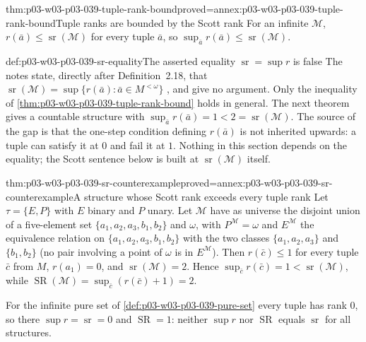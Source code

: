 \begin{hblemma}{thm:p03-w03-p03-039-tuple-rank-bound}{proved=annex:p03-w03-p03-039-tuple-rank-bound}{Tuple ranks are bounded by the Scott rank}
For an infinite \(\mathcal M\), \(r(\bar a)\le\operatorname{sr}(\mathcal M)\)
for every tuple \(\bar a\), so
\(\sup_{\bar a}r(\bar a)\le\operatorname{sr}(\mathcal M)\).
\end{hblemma}

\begin{hbwarning}{def:p03-w03-p03-039-sr-equality}{The asserted equality \(\operatorname{sr}=\sup r\) is false}
The notes state, directly after Definition~2.18, that
\(\operatorname{sr}(\mathcal M)=\sup\{r(\bar a):\bar a\in M^{<\omega}\}\)
\cite[p.~18]{Marker2014InfinitaryNotes}, and give no argument. Only the
inequality of \cref{thm:p03-w03-p03-039-tuple-rank-bound} holds in general.
The next theorem gives a countable structure with
\(\sup_{\bar a}r(\bar a)=1<2=\operatorname{sr}(\mathcal M)\). The source of
the gap is that the one-step condition defining \(r(\bar a)\) is not
inherited upwards: a tuple can satisfy it at \(0\) and fail it at \(1\).
Nothing in this section depends on the equality; the Scott sentence below is
built at \(\operatorname{sr}(\mathcal M)\) itself.
\end{hbwarning}

\begin{hbtheorem}{thm:p03-w03-p03-039-sr-counterexample}{proved=annex:p03-w03-p03-039-sr-counterexample}{A structure whose Scott rank exceeds every tuple rank}
Let \(\tau=\{E,P\}\) with \(E\) binary and \(P\) unary. Let \(\mathcal M\)
have as universe the disjoint union of a five-element set
\(\{a_1,a_2,a_3,b_1,b_2\}\) and \(\omega\), with
\(P^{\mathcal M}=\omega\) and \(E^{\mathcal M}\) the equivalence relation on
\(\{a_1,a_2,a_3,b_1,b_2\}\) with the two classes \(\{a_1,a_2,a_3\}\) and
\(\{b_1,b_2\}\) (no pair involving a point of \(\omega\) is in
\(E^{\mathcal M}\)). Then \(r(\bar c)\le1\) for every tuple \(\bar c\) from
\(M\), \(r(a_1)=0\), and \(\operatorname{sr}(\mathcal M)=2\). Hence
\(\sup_{\bar c}r(\bar c)=1<\operatorname{sr}(\mathcal M)\), while
\(\operatorname{SR}(\mathcal M)=\sup_{\bar c}(r(\bar c)+1)=2\).
\end{hbtheorem}

For the infinite pure set of \cref{def:p03-w03-p03-039-pure-set} every tuple
has rank \(0\), so there \(\sup r=\operatorname{sr}=0\) and
\(\operatorname{SR}=1\): neither \(\sup r\) nor \(\operatorname{SR}\) equals
\(\operatorname{sr}\) for all structures.

